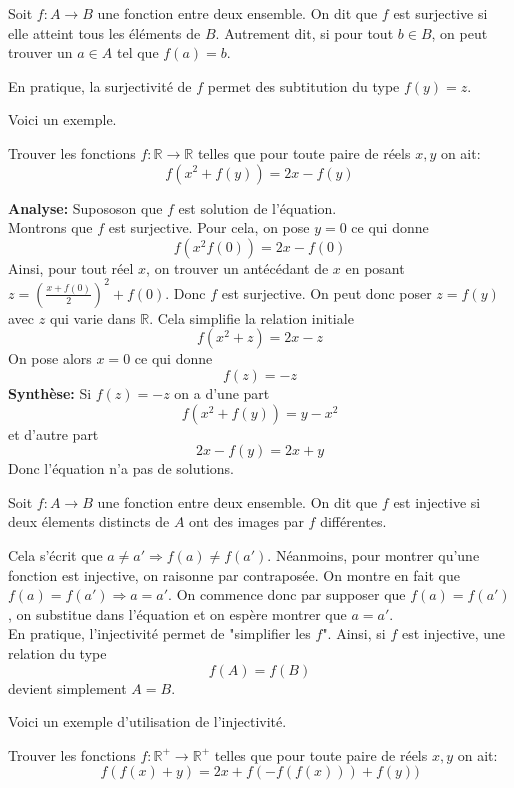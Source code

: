 \begin{dfn}[Surjectivité]
Soit $f:A\to B$ une fonction entre deux ensemble. On dit que $f$ est surjective si elle atteint tous les éléments de $B$. Autrement dit, si pour tout $b\in B$, on peut trouver un $a\in A$ tel que $f(a)=b$.

\end{dfn}
\begin{rem}
En pratique, la surjectivité de $f$ permet des subtitution du type $f(y)=z$.
\end{rem}
Voici un exemple.
\begin{ex}
Trouver les fonctions $f:\mathbb{R}\to \mathbb{R}$ telles que pour toute paire de réels $x,y$ on ait:
$$f(x^2+f(y))=2x-f(y) $$
\end{ex}
\begin{preuve}
\textbf{Analyse:} Supososon que $f$ est solution de l'équation.
\\
Montrons que $f$ est surjective. Pour cela, on pose $y=0$ ce qui donne 
$$f(x^2f(0))=2x-f(0) $$
Ainsi, pour tout réel $x$, on trouver un antécédant de $x$ en posant
$z=\left( \frac{x+f(0)}{2} \right) ^2+f(0)$. Donc $f$ est surjective. On peut donc poser $z=f(y)$ avec $z$ qui varie dans $\mathbb{R}$. Cela simplifie la relation initiale
$$f(x^2+z)=2x-z $$
On pose alors $x=0$ ce qui donne 
$$f(z)=-z $$
\textbf{Synthèse:}
Si $f(z)=-z$ on a d'une part $$f(x^2+f(y))=y-x^2$$ et d'autre part
$$ 2x-f(y)=2x+y$$
Donc l'équation n'a pas de solutions.
 \end{preuve}
\begin{dfn}[Injectivité]
Soit $f:A\to B$ une fonction entre deux ensemble. On dit que $f$ est injective si deux élements distincts de $A$ ont des images par $f$ différentes.
\end{dfn}
\begin{rem}
Cela s'écrit que $a\neq a'\Rightarrow f(a)\neq f(a')$. Néanmoins, pour montrer qu'une fonction est injective, on raisonne par contraposée. On montre en fait que 
$f(a)=f(a')\Rightarrow a=a'$. On commence donc par supposer que $f(a)=f(a')$, on substitue dans l'équation et on espère montrer que $a=a'$.
\\
En pratique, l'injectivité permet de "simplifier les $f$". Ainsi, si $f$ est injective, une relation du type
$$f(A)=f(B) $$ devient simplement $A=B$.
\end{rem}
Voici un exemple d'utilisation de l'injectivité.
\begin{ex}
Trouver les fonctions $f:\mathbb{R}^+\to \mathbb{R}^+$ telles que pour toute paire de réels $x,y$ on ait:
$$f(f(x)+y)=2x+f(-f(f(x)))+f(y)) $$
\end{ex}
